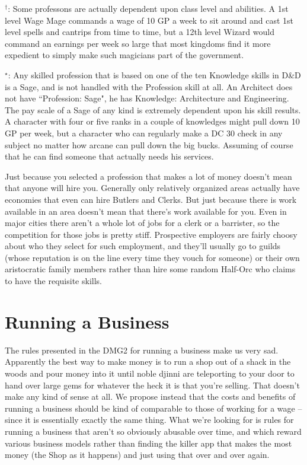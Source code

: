 \begin{multicols}{2}
\begin{small}
\noindent $^\dagger$: Some professons are actually dependent upon class level and abilities. A 1st level Wage Mage commands a wage of 10 GP a week to sit around and cast 1st level spells and cantrips from time to time, but a 12th level Wizard would command an earnings per week so large that most kingdoms find it more expedient to simply make such magicians part of the government.

\noindent $^\star$: Any skilled profession that is based on one of the ten Knowledge skills in D\&D is a Sage, and is not handled with the Profession skill at all. An Architect does not have ``Profession: Sage", he has Knowledge: Architecture and Engineering. The pay scale of a Sage of any kind is extremely dependent upon his skill results. A character with four or five ranks in a couple of knowledges might pull down 10 GP per week, but a character who can regularly make a DC 30 check in any subject no matter how arcane can pull down the big bucks. Assuming of course that he can find someone that actually needs his services.
\end{small}
\end{multicols}


Just because you selected a profession that makes a lot of money doesn't mean that anyone will hire you. Generally only relatively organized areas actually have economies that even can hire Butlers and Clerks. But just because there is work available in an area doesn't mean that there's work available for you. Even in major cities there aren't a whole lot of jobs for a clerk or a barrister, so the competition for those jobs is pretty stiff. Prospective employers are fairly choosy about who they select for such employment, and they'll usually go to guilds (whose reputation is on the line every time they vouch for someone) or their own aristocratic family members rather than hire some random Half-Orc who claims to have the requisite skills.

\section{Running a Business}

The rules presented in the DMG2 for running a business make us very sad. Apparently the best way to make money is to run a shop out of a shack in the woods and pour money into it until noble djinni are teleporting to your door to hand over large gems for whatever the heck it is that you're selling. That doesn't make any kind of sense at all. We propose instead that the costs and benefits of running a business should be kind of comparable to those of working for a wage -- since it is essentially exactly the same thing. What we're looking for is rules for running a business that aren't so obviously abusable over time, and which reward various business models rather than finding the killer app that makes the most money (the Shop as it happens) and just using that over and over again.

